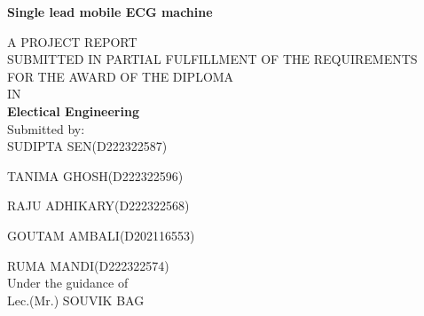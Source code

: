 \documentclass[12pt,a4paper]{report}
\begin{document}
\begin{center}
{\Large \textbf{Single lead mobile ECG machine}}\\
\vspace{0.5cm}

A PROJECT REPORT\\
SUBMITTED IN PARTIAL FULFILLMENT OF THE REQUIREMENTS\\
FOR THE AWARD OF THE DIPLOMA\\
IN\\
\textbf{Electical Engineering} \\
\vspace{1 cm}
Submitted by: \\

SUDIPTA SEN(D222322587)\\
\vspace{0.2cm}

TANIMA GHOSH(D222322596)\\
\vspace{0.2cm}

RAJU ADHIKARY(D222322568)\\
\vspace{0.2cm}

GOUTAM AMBALI(D202116553)\\
\vspace{0.2cm}

RUMA MANDI(D222322574)\\
\vspace{0.2cm}
\vspace{1 cm}
Under the guidance of\\

Lec.(Mr.) SOUVIK BAG\\

\end{center}
\end{document}
